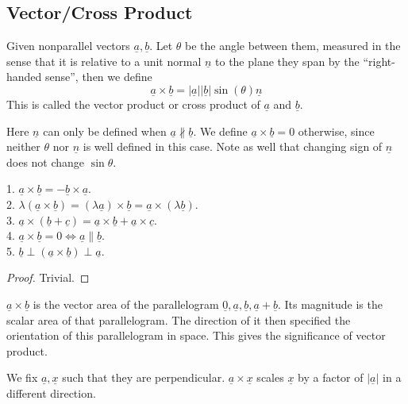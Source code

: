 \subsection{Vector/Cross Product}
\begin{definition}
    Given nonparallel vectors $\underline{a},\underline{b}$.
    Let $\theta$ be the angle between them, measured in the sense that it is relative to a unit normal $\underline{n}$ to the plane they span by the ``right-handed sense'', then we define
    $$\underline{a}\times\underline{b}=|\underline{a}||\underline{b}|\sin(\theta)\underline{n}$$
    This is called the vector product or cross product of $\underline{a}$ and $\underline{b}$.
\end{definition}
Here $\underline{n}$ can only be defined when $\underline{a}\nparallel\underline{b}$.
We define $\underline{a}\times\underline{b}=0$ otherwise, since neither $\theta$ nor $\underline{n}$ is well defined in this case.
Note as well that changing sign of $\underline{n}$ does not change $\sin\theta$.
\begin{proposition}
    1. $\underline{a}\times\underline{b}=-\underline{b}\times\underline{a}$.\\
    2. $\lambda(\underline{a}\times\underline{b})=(\lambda\underline{a})\times\underline{b}=\underline{a}\times(\lambda\underline{b})$.\\
    3. $\underline{a}\times(\underline{b}+\underline{c})=\underline{a}\times\underline{b}+\underline{a}\times\underline{c}$.\\
    4. $\underline{a}\times\underline{b}=0\iff\underline{a}\parallel\underline{b}$.\\
    5. $\underline{b}\perp(\underline{a}\times\underline{b})\perp\underline{a}$.
\end{proposition}
\begin{proof}
    Trivial.
\end{proof}
\begin{remark}
    $\underline{a}\times\underline{b}$ is the vector area of the parallelogram $\underline{0},\underline{a},\underline{b},\underline{a}+\underline{b}$.
    Its magnitude is the scalar area of that parallelogram.
    The direction of it then specified the orientation of this parallelogram in space.
    This gives the significance of vector product.
\end{remark}
We fix $\underline{a},\underline{x}$ such that they are perpendicular.
$\underline{a}\times\underline{x}$ scales $\underline{x}$ by a factor of $|\underline{a}|$ in a different direction.\\
